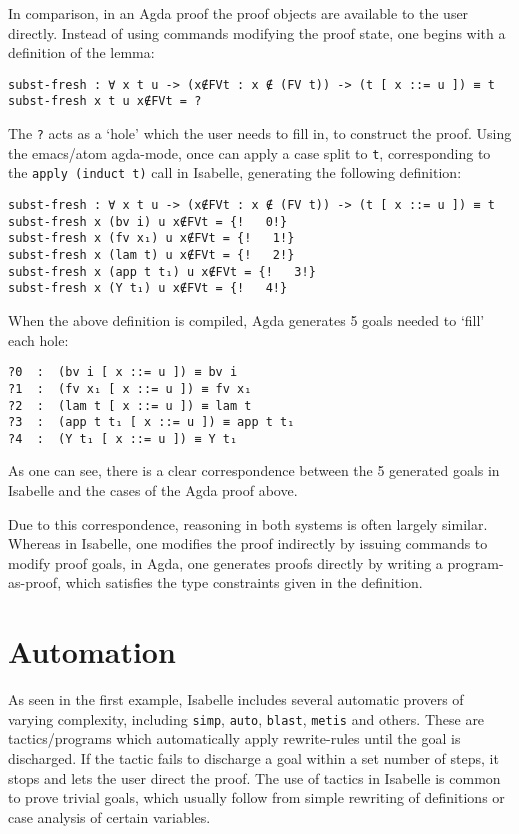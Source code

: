 \documentclass[a4paper, 12pt, twoside]{style/ociamthesis}
\theoremstyle{plain}
\theoremstyle{definition}
\theoremstyle{remark}
\begin{document}
In comparison, in an Agda proof the proof objects are available to the
user directly. Instead of using commands modifying the proof state, one
begins with a definition of the lemma:

\begin{verbatim}
subst-fresh : ∀ x t u -> (x∉FVt : x ∉ (FV t)) -> (t [ x ::= u ]) ≡ t
subst-fresh x t u x∉FVt = ?
\end{verbatim}

The \texttt{?} acts as a `hole' which the user needs to fill in, to
construct the proof. Using the emacs/atom agda-mode, once can apply a
case split to \texttt{t}, corresponding to the \texttt{apply (induct t)}
call in Isabelle, generating the following definition:

\begin{verbatim}
subst-fresh : ∀ x t u -> (x∉FVt : x ∉ (FV t)) -> (t [ x ::= u ]) ≡ t
subst-fresh x (bv i) u x∉FVt = {!   0!}
subst-fresh x (fv x₁) u x∉FVt = {!   1!}
subst-fresh x (lam t) u x∉FVt = {!   2!}
subst-fresh x (app t t₁) u x∉FVt = {!   3!}
subst-fresh x (Y t₁) u x∉FVt = {!   4!}
\end{verbatim}

When the above definition is compiled, Agda generates 5 goals needed to
`fill' each hole:

\begin{verbatim}
?0  :  (bv i [ x ::= u ]) ≡ bv i
?1  :  (fv x₁ [ x ::= u ]) ≡ fv x₁
?2  :  (lam t [ x ::= u ]) ≡ lam t
?3  :  (app t t₁ [ x ::= u ]) ≡ app t t₁
?4  :  (Y t₁ [ x ::= u ]) ≡ Y t₁
\end{verbatim}

As one can see, there is a clear correspondence between the 5 generated
goals in Isabelle and the cases of the Agda proof above.

Due to this correspondence, reasoning in both systems is often largely
similar. Whereas in Isabelle, one modifies the proof indirectly by
issuing commands to modify proof goals, in Agda, one generates proofs
directly by writing a program-as-proof, which satisfies the type
constraints given in the definition.

\section{Automation}\label{automation}

As seen in the first example, Isabelle includes several automatic
provers of varying complexity, including \texttt{simp}, \texttt{auto},
\texttt{blast}, \texttt{metis} and others. These are tactics/programs
which automatically apply rewrite-rules until the goal is discharged. If
the tactic fails to discharge a goal within a set number of steps, it
stops and lets the user direct the proof. The use of tactics in Isabelle
is common to prove trivial goals, which usually follow from simple
rewriting of definitions or case analysis of certain variables.
\end{document}
